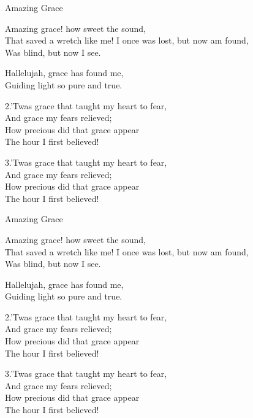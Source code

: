 \documentclass[12pt]{article}
\begin{document}
\begin{hymn}{4}{Amazing Grace}

\begin{stanza}
Amazing grace! how sweet the sound,\\
That saved a wretch like me!
I once was lost, but now am found,\\
Was blind, but now I see.
\end{stanza}

\begin{chorus}
Hallelujah, grace has found me,\\
Guiding light so pure and true.
\end{chorus}

\begin{stanza}
2.’Twas grace that taught my heart to fear,\\
And grace my fears relieved;\\
How precious did that grace appear\\
The hour I first believed!
\end{stanza}

\begin{stanza}
3.’Twas grace that taught my heart to fear,\\
And grace my fears relieved;\\
How precious did that grace appear\\
The hour I first believed!
\end{stanza}
\end{hymn}

\begin{hymn}{5}{Amazing Grace}

\begin{stanza}
Amazing grace! how sweet the sound,\\
That saved a wretch like me!
I once was lost, but now am found,\\
Was blind, but now I see.
\end{stanza}

\begin{chorus}
Hallelujah, grace has found me,\\
Guiding light so pure and true.
\end{chorus}

\begin{stanza}
2.’Twas grace that taught my heart to fear,\\
And grace my fears relieved;\\
How precious did that grace appear\\
The hour I first believed!
\end{stanza}

\begin{stanza}
3.’Twas grace that taught my heart to fear,\\
And grace my fears relieved;\\
How precious did that grace appear\\
The hour I first believed!
\end{stanza}
\end{hymn}

\newpage
\tableofcontents
\end{document}
